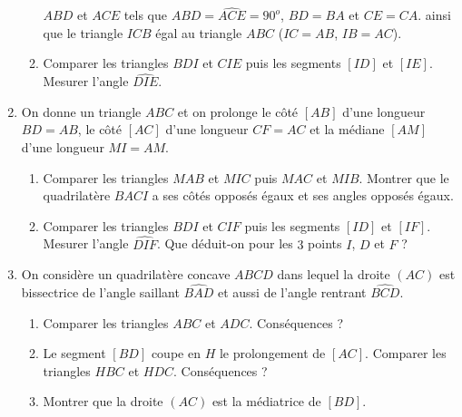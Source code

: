 \documentclass[12 pt]{report}
\theoremstyle{plain}
\newcounter{n}
\begin{document}
\begin{enumerate}
\begin{enumerate}
$ABD$ et $ACE$ tels que $\widehat{ABD}= \widehat{ACE}=90^o$, $BD=BA$ et $CE=CA$. ainsi que le triangle $ICB$ égal au triangle $ABC$ ($IC=AB$, $IB=AC$). 
\item Comparer les triangles $BDI$ et $CIE$ puis les segments $[ID]$ et $[IE]$. 
Mesurer l'angle $\widehat{DIE}$. 
\end{enumerate}
\item On donne un triangle $ABC$ et on prolonge le côté $[AB]$ d'une longueur $BD=AB$, le côté $[AC]$ d'une longueur $CF=AC$ et la médiane $[AM]$ d'une longueur $MI=AM$.
\begin{enumerate}
\item Comparer les triangles $MAB$ et $MIC$ puis $MAC$ et $MIB$. Montrer que le quadrilatère $BACI$ a ses côtés opposés égaux et ses angles opposés égaux. 
\item Comparer les triangles $BDI$ et $CIF$ puis les segments $[ID]$ et $[IF]$. 
Mesurer l'angle $\widehat{DIF}$. Que déduit-on pour les $3$ points $I$, $D$ et $F$ ?
\end{enumerate}
\item On considère un quadrilatère concave $ABCD$ dans lequel la droite $(AC)$ est bissectrice de l'angle saillant $\widehat{BAD}$ et aussi de l'angle rentrant $\widehat{BCD}$. 
\begin{enumerate}
\item Comparer les triangles $ABC$ et $ADC$. Conséquences ? 
\item Le segment $[BD]$ coupe en $H$ le prolongement de $[AC]$. Comparer les triangles $HBC$ et $HDC$. Conséquences ? 
\item Montrer que la droite $(AC)$ est la médiatrice de $[BD]$. 
\end{enumerate}
\end{enumerate}
\end{document}
